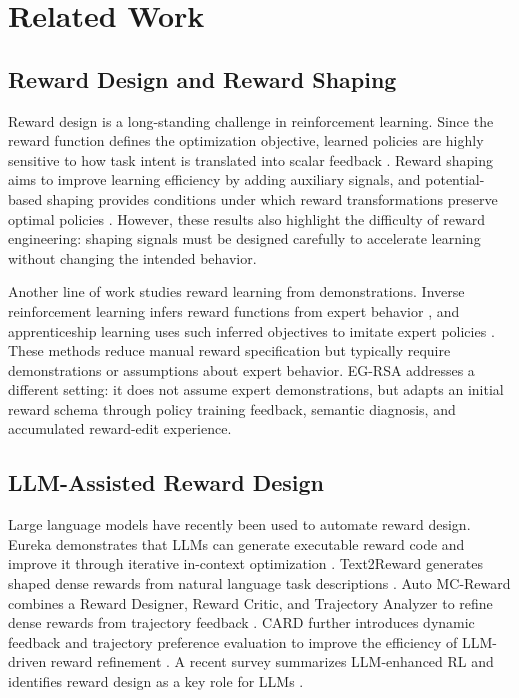 \documentclass[11pt]{article}
\begin{document}
\section{Related Work}
\label{sec:related}

\subsection{Reward Design and Reward Shaping}

Reward design is a long-standing challenge in reinforcement learning. Since the reward function defines the optimization objective, learned policies are highly sensitive to how task intent is translated into scalar feedback \citep{sutton2018reinforcement}. Reward shaping aims to improve learning efficiency by adding auxiliary signals, and potential-based shaping provides conditions under which reward transformations preserve optimal policies \citep{ng1999policy}. However, these results also highlight the difficulty of reward engineering: shaping signals must be designed carefully to accelerate learning without changing the intended behavior.

Another line of work studies reward learning from demonstrations. Inverse reinforcement learning infers reward functions from expert behavior \citep{ng2000irl}, and apprenticeship learning uses such inferred objectives to imitate expert policies \citep{abbeel2004apprenticeship}. These methods reduce manual reward specification but typically require demonstrations or assumptions about expert behavior. EG-RSA addresses a different setting: it does not assume expert demonstrations, but adapts an initial reward schema through policy training feedback, semantic diagnosis, and accumulated reward-edit experience.

\subsection{LLM-Assisted Reward Design}

Large language models have recently been used to automate reward design. Eureka demonstrates that LLMs can generate executable reward code and improve it through iterative in-context optimization \citep{ma2023eureka}. Text2Reward generates shaped dense rewards from natural language task descriptions \citep{xie2023text2reward}. Auto MC-Reward combines a Reward Designer, Reward Critic, and Trajectory Analyzer to refine dense rewards from trajectory feedback \citep{li2023automcreward}. CARD further introduces dynamic feedback and trajectory preference evaluation to improve the efficiency of LLM-driven reward refinement \citep{sun2024card}. A recent survey summarizes LLM-enhanced RL and identifies reward design as a key role for LLMs \citep{cao2024survey}.
\end{document}
